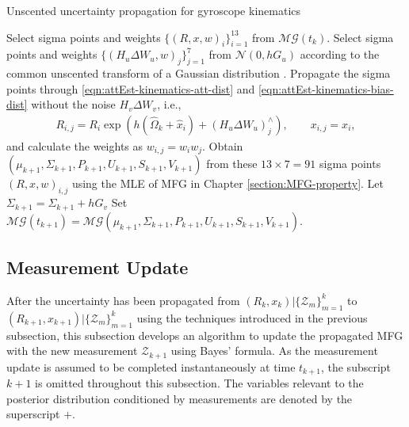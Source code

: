 \begin{table}
	\caption{Unscented uncertainty propagation for gyroscope kinematics \label{tab:attEst-prop-unscented}}
	\begin{algorithmic}[1]
		\algrule[0.8pt]
		\algrule
		\State Select sigma points and weights $\{(R,x,w)_i\}_{i=1}^{13}$ from $\mathcal{MG}(t_k)$.
		\State Select sigma points and weights $\{(H_u\Delta W_u,w)_{j}\}_{j=1}^7$ from $\mathcal{N}({0},hG_u)$ according to the common unscented transform of a Gaussian distribution \cite{haug2012bayesian}.
		\State Propagate the sigma points through \eqref{eqn:attEst-kinematics-att-dist} and \eqref{eqn:attEst-kinematics-bias-dist} without the noise $H_v\Delta W_v$, i.e.,
		\begin{align*}
			R_{i,j} = R_i\exp(h(\hat{\Omega}_k + \hat{x}_i) + (H_u\Delta W_u)_j^\wedge), \qquad x_{i,j} = x_i,
		\end{align*}
		and calculate the weights as $w_{i,j}=w_iw_j$.
		\State Obtain $(\mu_{k+1},\Sigma_{k+1},P_{k+1},U_{k+1},S_{k+1},V_{k+1})$ from these $13 \times 7 = 91$ sigma points $(R,x,w)_{i,j}$ using the MLE of MFG in Chapter \ref{section:MFG-property}.
		\State Let $\Sigma_{k+1} = \Sigma_{k+1}+hG_v$
		\State Set $\mathcal{MG}(t_{k+1}) = \mathcal{MG}(\mu_{k+1},\Sigma_{k+1},P_{k+1},U_{k+1},S_{k+1},V_{k+1})$.
		\EndProcedure
		\algrule[0.8pt]
	\end{algorithmic}
\end{table}

\subsection{Measurement Update} \label{section:attEst-update}

After the uncertainty has been propagated from $(R_k,x_k) | \{\mathcal{Z}_m\}_{m=1}^k$ to $(R_{k+1},x_{k+1}) | \{\mathcal{Z}_m\}_{m=1}^k$ using the techniques introduced in the previous subsection, this subsection develops an algorithm to update the propagated MFG with the new measurement $\mathcal{Z}_{k+1}$ using Bayes' formula.
As the measurement update is assumed to be completed instantaneously at time $t_{k+1}$, the subscript $k+1$ is omitted throughout this subsection. 
The variables relevant to the posterior distribution conditioned by measurements are denoted by the superscript $+$.

